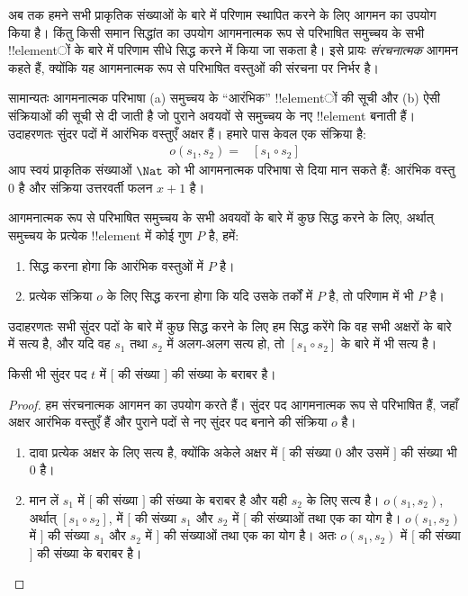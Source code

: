 \documentclass[../../../include/open-logic-section]{subfiles}
\begin{document}


अब तक हमने सभी प्राकृतिक संख्याओं के बारे में परिणाम स्थापित करने के लिए
आगमन का उपयोग किया है। किंतु किसी समान सिद्धांत का उपयोग आगमनात्मक रूप से
परिभाषित समुच्चय के सभी !!{element}ों के बारे में परिणाम सीधे सिद्ध करने
में किया जा सकता है। इसे प्रायः \emph{संरचनात्मक} आगमन कहते हैं, क्योंकि
यह आगमनात्मक रूप से परिभाषित वस्तुओं की संरचना पर निर्भर है।

सामान्यतः आगमनात्मक परिभाषा (a) समुच्चय के ``आरंभिक'' !!{element}ों की
सूची और (b) ऐसी संक्रियाओं की सूची से दी जाती है जो पुराने अवयवों से
समुच्चय के नए !!{element} बनाती हैं। उदाहरणतः सुंदर पदों में आरंभिक वस्तुएँ
अक्षर हैं। हमारे पास केवल एक संक्रिया है:
\begin{align*}
  o(s_1, s_2) = & [s_1 \circ s_2]
\end{align*}
आप स्वयं प्राकृतिक संख्याओं $\Nat$ को भी आगमनात्मक परिभाषा से दिया मान
सकते हैं: आरंभिक वस्तु $0$ है और संक्रिया उत्तरवर्ती फलन $x+1$ है।

आगमनात्मक रूप से परिभाषित समुच्चय के सभी अवयवों के बारे में कुछ सिद्ध करने
के लिए, अर्थात् समुच्चय के प्रत्येक !!{element} में कोई गुण $P$ है, हमें:
\begin{enumerate}
\item सिद्ध करना होगा कि आरंभिक वस्तुओं में $P$ है।
\item प्रत्येक संक्रिया $o$ के लिए सिद्ध करना होगा कि यदि उसके तर्कों में
  $P$ है, तो परिणाम में भी $P$ है।
\end{enumerate}
उदाहरणतः सभी सुंदर पदों के बारे में कुछ सिद्ध करने के लिए हम सिद्ध करेंगे
कि वह सभी अक्षरों के बारे में सत्य है, और यदि वह $s_1$ तथा $s_2$ में अलग-अलग
सत्य हो, तो $[s_1\circ s_2]$ के बारे में भी सत्य है।

\begin{prop}
  किसी भी सुंदर पद $t$ में $[$ की संख्या $]$ की संख्या के बराबर है।
\end{prop}

\begin{proof}
हम संरचनात्मक आगमन का उपयोग करते हैं। सुंदर पद आगमनात्मक रूप से परिभाषित
हैं, जहाँ अक्षर आरंभिक वस्तुएँ हैं और पुराने पदों से नए सुंदर पद बनाने की
संक्रिया $o$ है।
\begin{enumerate}
\item दावा प्रत्येक अक्षर के लिए सत्य है, क्योंकि अकेले अक्षर में $[$ की
  संख्या $0$ और उसमें $]$ की संख्या भी $0$ है।
\item मान लें $s_1$ में $[$ की संख्या $]$ की संख्या के बराबर है और यही
  $s_2$ के लिए सत्य है। $o(s_1,s_2)$, अर्थात् $[s_1\circ s_2]$, में $[$
  की संख्या $s_1$ और $s_2$ में $[$ की संख्याओं तथा एक का योग है।
  $o(s_1,s_2)$ में $]$ की संख्या $s_1$ और $s_2$ में $]$ की संख्याओं तथा
  एक का योग है। अतः $o(s_1,s_2)$ में $[$ की संख्या $]$ की संख्या के बराबर
  है।
\end{enumerate}
\end{proof}
\end{document}
